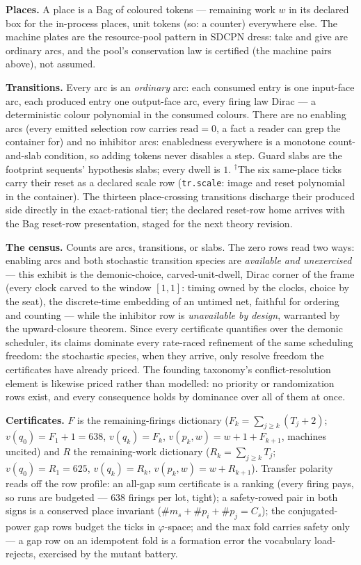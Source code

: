 {\medskip
\noindent\textbf{Places.} A place is a Bag of coloured tokens ---
remaining work $w$ in its declared box for the in-process places,
unit tokens (so: a counter) everywhere else. The
machine plates are the resource-pool pattern in SDCPN dress: take
and give are ordinary arcs, and the pool's conservation law is
certified (the machine pairs above), not assumed.

\smallskip
\noindent\textbf{Transitions.} Every arc is an \emph{ordinary} arc:
each consumed entry is one input-face arc, each produced entry one
output-face arc, every firing law Dirac --- a deterministic colour
polynomial in the consumed colours. There are no enabling arcs
(every emitted selection row carries $\text{read} = 0$, a fact a
reader can grep the container for) and no inhibitor arcs:
enabledness everywhere is a monotone count-and-slab condition, so
adding tokens never disables a step. Guard slabs are the footprint
sequents' hypothesis slabs; every dwell is $1$.
$^{\dagger}$The six same-place ticks carry their reset as a declared
scale row (\texttt{tr.scale}: image and reset polynomial in the
container). The thirteen place-crossing transitions discharge their
produced side directly in the exact-rational tier; the declared
reset-row home arrives with the Bag reset-row presentation, staged
for the next theory revision.

\smallskip
\noindent\textbf{The census.} Counts are arcs, transitions, or slabs.
The zero rows read two ways: enabling arcs and both stochastic
transition species are \emph{available and unexercised} --- this
exhibit is the demonic-choice, carved-unit-dwell, Dirac corner of
the frame (every clock carved to the window $[1,1]$: timing owned
by the clocks, choice by the seat), the discrete-time embedding of
an untimed net, faithful for ordering and counting --- while the
inhibitor row is
\emph{unavailable by design}, warranted by the upward-closure
theorem. Since every certificate quantifies over the demonic
scheduler, its claims dominate every rate-raced refinement of the
same scheduling freedom: the stochastic species, when they arrive,
only resolve freedom the certificates have already priced. The
founding taxonomy's conflict-resolution element is likewise priced
rather than modelled: no priority or randomization rows exist, and
every consequence holds by dominance over all of them at once.

\smallskip
\noindent\textbf{Certificates.} $F$ is the remaining-firings
dictionary ($F_k = \sum_{j \ge k} (T_j + 2)$;
$v(q_0) = F_1 + 1 = 638$, $v(q_k) = F_k$,
$v(p_k, w) = w + 1 + F_{k+1}$, machines uncited) and $R$ the
remaining-work dictionary ($R_k = \sum_{j \ge k} T_j$;
$v(q_0) = R_1 = 625$, $v(q_k) = R_k$,
$v(p_k, w) = w + R_{k+1}$). Transfer polarity reads off the row
profile: an all-gap sum certificate is a ranking (every firing pays,
so runs are budgeted --- $638$ firings per lot, tight); a
safety-rowed pair in both signs is a conserved place invariant
($\#m_s + \#p_i + \#p_j = C_s$); the conjugated-power gap rows
budget the ticks in $\varphi$-space; and the max fold carries safety
only --- a gap row on an idempotent fold is a formation error the
vocabulary load-rejects, exercised by the mutant battery.

}
